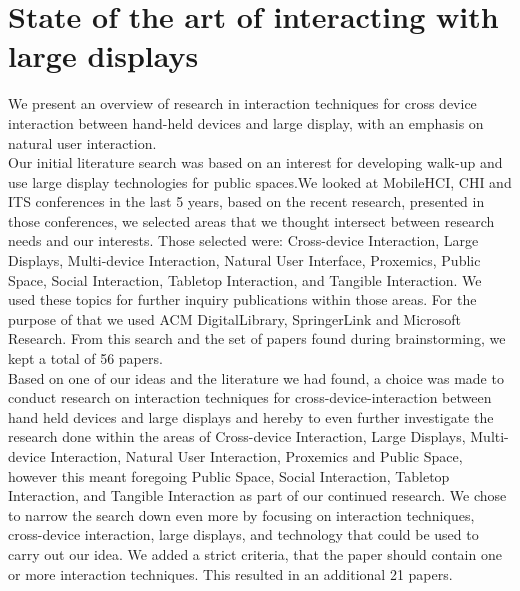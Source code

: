 \section{State of the art of interacting with large displays}
We present an overview of research in interaction techniques for cross device interaction between hand-held devices and large display, with an emphasis on natural user interaction.\\

Our initial literature search was based on an interest for developing walk-up and use large display technologies for public spaces.We looked at MobileHCI, CHI and ITS conferences in the last 5 years, based on the recent research, presented in those conferences, we selected areas that we thought intersect between research needs and our interests. Those selected were: Cross-device Interaction, Large Displays, Multi-device Interaction, Natural User Interface, Proxemics, Public Space, Social Interaction, Tabletop Interaction, and Tangible Interaction. We used these topics for further inquiry publications within those areas. For the purpose of that we used ACM DigitalLibrary, SpringerLink and Microsoft Research. From this search and the set of papers found during brainstorming, we kept a total of 56 papers.\\ 

Based on one of our ideas and the literature we had found, a choice was made to conduct research on interaction techniques for cross-device-interaction between hand held devices and large displays and hereby to even further investigate the research done within the areas of Cross-device Interaction, Large Displays, Multi-device Interaction, Natural User Interaction, Proxemics and Public Space, however this meant foregoing Public Space, Social Interaction, Tabletop Interaction, and Tangible Interaction as part of our continued research. We chose to narrow the search down even more by focusing on interaction techniques, cross-device interaction, large displays, and technology that could be used to carry out our idea. We added a strict criteria, that the paper should contain one or more interaction techniques. This resulted in an additional 21 papers.\\ 


